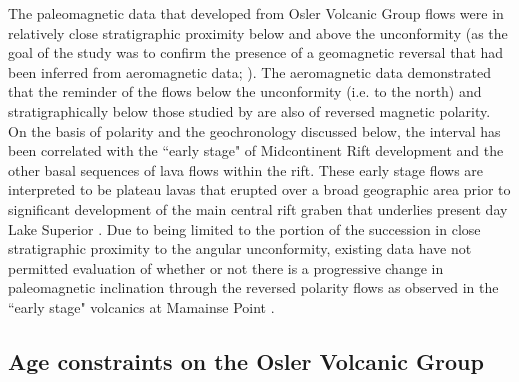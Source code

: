 \documentclass[draft,gc]{AGUTeX}
\begin{document}
\begin{article}
The paleomagnetic data that \citet{Halls1974a} developed from Osler Volcanic Group flows were in relatively close stratigraphic proximity below and above the unconformity (as the goal of the study was to confirm the presence of a geomagnetic reversal that had been inferred from aeromagnetic data; \cite{Halls1972a}). The aeromagnetic data demonstrated that the reminder of the flows below the unconformity (i.e. to the north) and stratigraphically below those studied by \citet{Halls1974a} are also of reversed magnetic polarity. On the basis of polarity and the geochronology discussed below, the interval has been correlated with the ``early stage" of Midcontinent Rift development and the other basal sequences of lava flows within the rift. These early stage flows are interpreted to be plateau lavas that erupted over a broad geographic area prior to significant development of the main central rift graben that underlies present day Lake Superior \citep{Cannon1992b}. Due to being limited to the portion of the succession in close stratigraphic proximity to the angular unconformity, existing data have not permitted evaluation of whether or not there is a progressive change in paleomagnetic inclination through the reversed polarity flows as observed in the ``early stage" volcanics at Mamainse Point \citep{Swanson-Hysell2009a}.

\subsection{Age constraints on the Osler Volcanic Group}


\end{article}
\end{document}
